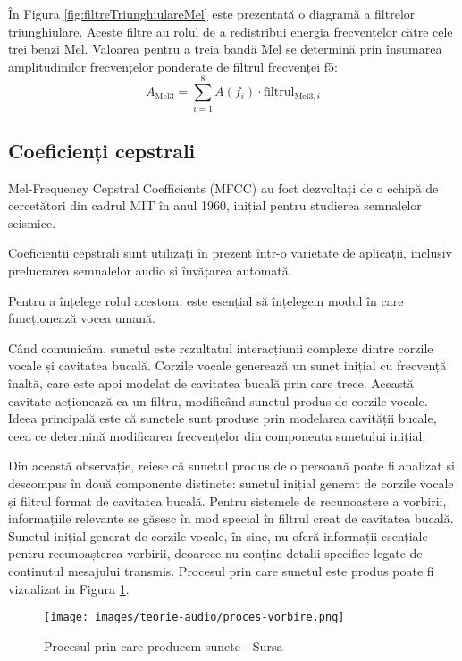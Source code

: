 În Figura \ref{fig:filtreTriunghiulareMel} este prezentată o diagramă a filtrelor triunghiulare. Aceste filtre au rolul de a redistribui energia frecvențelor către cele trei benzi Mel. Valoarea pentru a treia bandă Mel se determină prin însumarea amplitudinilor frecvențelor ponderate de filtrul frecvenței f5:
\[ A_{\text{Mel3}} = \sum_{i=1}^{8} A(f_i) \cdot \text{filtrul}_{\text{Mel3},i} \]


\subsection{Coeficienți cepstrali}

Mel-Frequency Cepstral Coefficients (MFCC) au fost dezvoltați de o echipă de cercetători din cadrul MIT în anul 1960, inițial pentru studierea semnalelor seismice.

Coeficientii cepstrali sunt utilizați în prezent într-o varietate de aplicații, inclusiv prelucrarea semnalelor audio și învățarea automată.

Pentru a înțelege rolul acestora, este esențial să înțelegem modul în care funcționează vocea umană.

Când comunicăm, sunetul este rezultatul interacțiunii complexe dintre corzile vocale și cavitatea bucală. Corzile vocale generează un sunet inițial cu frecvență înaltă, care este apoi modelat de cavitatea bucală prin care trece. Această cavitate acționează ca un filtru, modificând sunetul produs de corzile vocale. Ideea principală este că sunetele sunt produse prin modelarea cavității bucale, ceea ce determină modificarea frecvențelor din componenta sunetului inițial.

Din această observație, reiese că sunetul produs de o persoană poate fi analizat și descompus în două componente distincte: sunetul inițial generat de corzile vocale și filtrul format de cavitatea bucală. Pentru sistemele de recunoaștere a vorbirii, informațiile relevante se găsesc în mod special în filtrul creat de cavitatea bucală. Sunetul inițial generat de corzile vocale, în sine, nu oferă informații esențiale pentru recunoașterea vorbirii, deoarece nu conține detalii specifice legate de conținutul mesajului transmis. Procesul prin care sunetul este produs poate fi vizualizat in Figura \ref{fig:speechProcess}.

\begin{figure}
    \centering
    \texttt{[image: images/teorie-audio/proces-vorbire.png]}
    \caption{Procesul prin care producem sunete - Sursa \cite{speechProcess}}
    \label{fig:speechProcess}
\end{figure}

